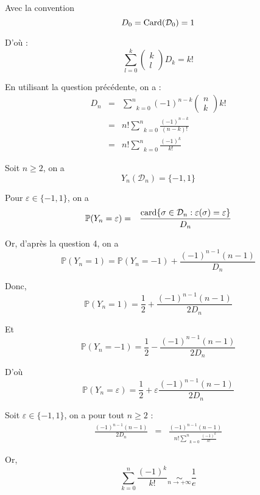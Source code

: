 Avec la convention
\[ D_0 = \operatorname{Card} (\mathcal{D}_0) = 1 \]


D'o{\`u} :
\[ \underset{l = 0}{\overset{k}{\sum}} \left( \begin{array}{c}
     k\\
     l
   \end{array} \right) D_k = k! \]


En utilisant la question pr{\'e}c{\'e}dente, on a :
\begin{eqnarray*}
  D_n & = & \underset{k = 0}{\overset{n}{\sum}} (- 1)^{n - k} \left(
  \begin{array}{c}
    n\\
    k
  \end{array} \right) k!\\
  & = & n! \underset{k = 0}{\overset{n}{\sum}} \frac{(- 1)^{n - k}}{(n - k)
  !}\\
  & = & n! \underset{k = 0}{\overset{n}{\sum}} \frac{(- 1)^k}{k!}
\end{eqnarray*}


 Soit $n \geqslant 2$, on a
\[ Y_n (\mathcal{D}_n) = \{ - 1, 1 \} \]


Pour $\varepsilon \in \{ - 1, 1 \}$, on a
\begin{eqnarray*}
  \mathbb{P} (Y_n = \varepsilon) & = & \frac{\operatorname{card} \{ \sigma \in
  \mathcal{D}_n : \varepsilon (\sigma) = \varepsilon \}}{D_n}
\end{eqnarray*}


Or, d'apr{\`e}s la question 4, on a
\[ \mathbb{P} (Y_n = 1) =\mathbb{P} (Y_n = - 1) + \frac{(- 1)^{n - 1} (n -
   1)}{D_n} \]


Donc,
\[ \mathbb{P} (Y_n = 1) = \frac{1}{2} + \frac{(- 1)^{n - 1} (n - 1)}{2 D_n} \]


Et
\[ \mathbb{P} (Y_n = - 1) = \frac{1}{2} - \frac{(- 1)^{n - 1} (n - 1)}{2 D_n}
\]


D'o{\`u}
\[ \mathbb{P} (Y_n = \varepsilon) = \frac{1}{2} + \varepsilon \frac{(- 1)^{n -
   1} (n - 1)}{2 D_n} \]


 Soit $\varepsilon \in \{ - 1, 1 \}$, on a pour tout $n
\geqslant 2$ :
\begin{eqnarray*}
  \frac{(- 1)^{n - 1} (n - 1)}{2 D_n} & = & \frac{(- 1)^{n - 1} (n - 1)}{n!
  \underset{k = 0}{\overset{n}{\sum}} \frac{(- 1)^k}{k!}}
\end{eqnarray*}


Or,
\[ \underset{k = 0}{\overset{n}{\sum}} \frac{(- 1)^k}{k!} \underset{n
   \rightarrow + \infty}{\sim} \frac{1}{e} \]


